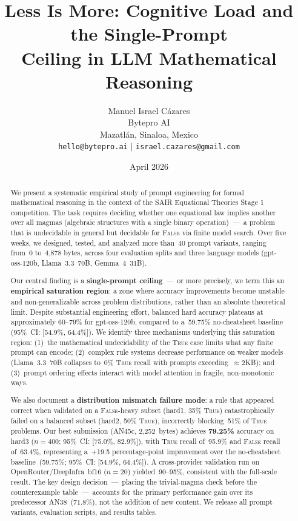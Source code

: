 \documentclass[11pt]{article}
\title{\textbf{Less Is More: Cognitive Load and the Single-Prompt\\
Ceiling in LLM Mathematical Reasoning}}
\author{
  Manuel Israel C\'{a}zares \\
  Bytepro AI \\
  Mazatl\'{a}n, Sinaloa, Mexico \\
  \texttt{hello@bytepro.ai} $|$ \texttt{israel.cazares@gmail.com}
}
\date{April 2026}
\begin{document}
\maketitle

\begin{abstract}
We present a systematic empirical study of prompt engineering for
formal mathematical reasoning in the context of the SAIR Equational
Theories Stage 1 competition. The task requires deciding whether one
equational law implies another over all magmas (algebraic structures
with a single binary operation)~---~a problem that is undecidable in
general but decidable for \textsc{False} via finite model search. Over
five weeks, we designed, tested, and analyzed more than~40 prompt
variants, ranging from~0 to~4{,}878 bytes, across four evaluation
splits and three language models (gpt-oss-120b, Llama~3.3~70B,
Gemma~4~31B).

Our central finding is a \textbf{single-prompt ceiling}~---~or more
precisely, we term this an \textbf{empirical saturation region}: a zone
where accuracy improvements become unstable and non-generalizable across
problem distributions, rather than an absolute theoretical limit. Despite
substantial engineering effort, balanced hard accuracy plateaus at
approximately 60--79\% for gpt-oss-120b, compared to a~59.75\%
no-cheatsheet baseline (95\%~CI: [54.9\%, 64.4\%]). We identify three
mechanisms underlying this saturation region: (1)~the mathematical
undecidability of the \textsc{True} case limits what any finite prompt
can encode; (2)~complex rule systems decrease performance on weaker models
(Llama~3.3~70B collapses to~0\% \textsc{True} recall with prompts
exceeding~$\approx$2KB); and (3)~prompt ordering effects interact with
model attention in fragile, non-monotonic ways.

We also document a \textbf{distribution mismatch failure mode}: a
rule that appeared correct when validated on a \textsc{False}-heavy
subset (hard1, 35\% \textsc{True}) catastrophically failed on a balanced
subset (hard2, 50\% \textsc{True}), incorrectly blocking~51\% of
\textsc{True} problems. Our best submission (AN45c, 2{,}252~bytes) achieves \textbf{79.25\%}
accuracy on hard3 ($n=400$; 95\%~CI: [75.0\%, 82.9\%]), with
\textsc{True} recall of~95.9\% and \textsc{False} recall of~63.4\%,
representing a~+19.5 percentage-point improvement over the
no-cheatsheet baseline~(59.75\%; 95\%~CI: [54.9\%, 64.4\%]). A cross-provider validation run on
OpenRouter/DeepInfra~bf16 ($n=20$) yielded~90--95\%, consistent with
the full-scale result. The key design decision~---~placing the
trivial-magma check before the counterexample table~---~accounts for
the primary performance gain over its predecessor AN38~(71.8\%),
not the addition of new content. We release all prompt variants,
evaluation scripts, and results tables.


\end{abstract}
\end{document}
